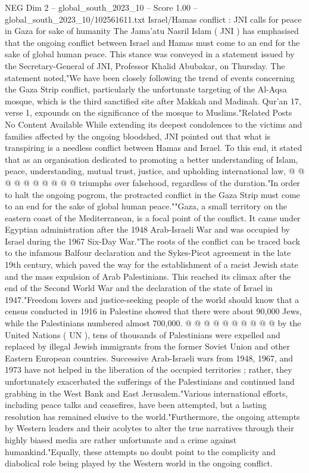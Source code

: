 \begin{textsample}{NEG Dim 2 – global\_south\_2023\_10 – Score 1.00 – global\_south\_2023\_10/102561611.txt}  \label{ex:f2_neg_275}
Israel/Hamas conflict : JNI calls for peace in Gaza for sake of humanity The Jama'atu Nasril Islam ( JNI ) has emphasised that the ongoing conflict between Israel and Hamas must come to an end for the sake of global human peace.
This stance was conveyed in a statement issued by the Secretary-General of JNI, Professor Khalid Abubakar, on Thursday.
The statement noted,"We have been closely following the trend of events concerning the Gaza Strip conflict, particularly the unfortunate targeting of the Al-Aqsa mosque, which is the third sanctified site after Makkah and Madinah.
Qur'an 17, verse 1, expounds on the significance of the mosque to Muslims."Related Posts No Content Available While extending its deepest condolences to the victims and families affected by the ongoing bloodshed, JNI pointed out that what is transpiring is a needless conflict between Hamas and Israel.
To this end, it stated that as an organisation dedicated to promoting a better understanding of Islam, peace, understanding, mutual trust, justice, and upholding international law, @ @ @ @ @ @ @ @ @ @ triumphs over falsehood, regardless of the duration."In order to halt the ongoing pogrom, the protracted conflict in the Gaza Strip must come to an end for the sake of global human peace.""Gaza, a small territory on the eastern coast of the Mediterranean, is a focal point of the conflict.
It came under Egyptian administration after the 1948 Arab-Israeli War and was occupied by Israel during the 1967 Six-Day War."The roots of the conflict can be traced back to the infamous Balfour declaration and the Sykes-Picot agreement in the late 19th century, which paved the way for the establishment of a racist Jewish state and the mass expulsion of Arab Palestinians.
This reached its climax after the end of the Second World War and the declaration of the state of Israel in 1947."Freedom lovers and justice-seeking people of the world should know that a census conducted in 1916 in Palestine showed that there were about 90,000 Jews, while the Palestinians numbered almost 700,000. @ @ @ @ @ @ @ @ @ @ by the United Nations ( UN ), tens of thousands of Palestinians were expelled and replaced by illegal Jewish immigrants from the former Soviet Union and other Eastern European countries.
Successive Arab-Israeli wars from 1948, 1967, and 1973 have not helped in the liberation of the occupied territories ; rather, they unfortunately exacerbated the sufferings of the Palestinians and continued land grabbing in the West Bank and East Jerusalem."Various international efforts, including peace talks and ceasefires, have been attempted, but a lasting resolution has remained elusive to the world."Furthermore, the ongoing attempts by Western leaders and their acolytes to alter the true narratives through their highly biased media are rather unfortunate and a crime against humankind."Equally, these attempts no doubt point to the complicity and diabolical role being played by the Western world in the ongoing conflict.

\end{textsample}
